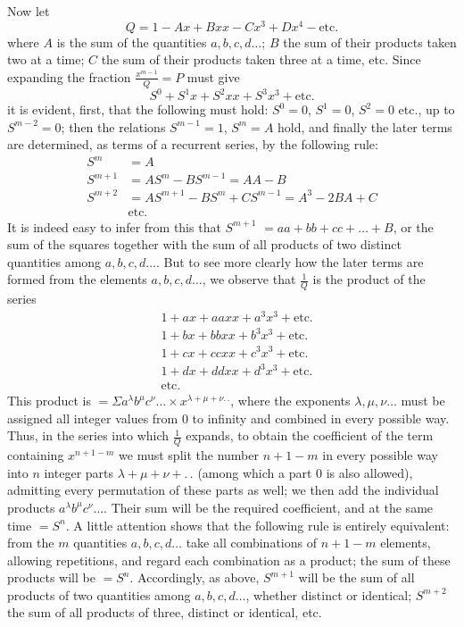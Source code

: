 Now let
\[
Q=1-Ax+Bxx-Cx^3+Dx^4-\text{etc.}
\]
where $A$ is the sum of the quantities $a,b,c,d\ldots$; $B$ the sum of their products taken two at a time; $C$ the sum of their products taken three at a time, etc. Since expanding the fraction $\frac{x^{m-1}}Q=P$ must give
\[
S^0+S^1x+S^2xx+S^3x^3+\text{etc.}
\]
it is evident, first, that the following must hold: $S^0=0$, $S^1=0$, $S^2=0$ etc., up to $S^{m-2}=0$; then
the relations $S^{m-1}=1$, $S^m=A$ hold, and finally the later terms are determined, as terms of a recurrent series, by the following rule:
\[
\begin{aligned}
S^m&=A\\
S^{m+1}&=AS^m-BS^{m-1}=AA-B\\
S^{m+2}&=AS^{m+1}-BS^m+CS^{m-1}=A^3-2BA+C\\
&\text{etc.}
\end{aligned}
\]
It is indeed easy to infer from this that $S^{m+1}$ $=aa+bb+cc+\ldots+B$, or the sum of the squares together with the sum of all products of two distinct quantities among $a,b,c,d\ldots$. But to see more clearly how the later terms are formed from the elements $a,b,c,d\ldots$, we observe that $\frac1Q$ is the product of the series
\[
\begin{aligned}
&1+ax+aaxx+a^3x^3+\text{etc.}\\
&1+bx+bbxx+b^3x^3+\text{etc.}\\
&1+cx+ccxx+c^3x^3+\text{etc.}\\
&1+dx+ddxx+d^3x^3+\text{etc.}\\
&\text{etc.}
\end{aligned}
\]
This product is $=\Sigma a^\lambda b^\mu c^\nu\ldots\times x^{\lambda+\mu+\nu.\,.}$, where the exponents $\lambda,\mu,\nu\ldots$ must be assigned all integer values from 0 to infinity and combined in every possible way. Thus, in the series into which $\frac1Q$ expands, to obtain the coefficient of the term containing $x^{n+1-m}$ we must split the number $n+1-m$ in every possible way into $n$ integer parts $\lambda+\mu+\nu+.\,.$ (among which a part 0 is also allowed), admitting every permutation of these parts as well; we then add the individual products $a^\lambda b^\mu c^\nu\ldots$. Their sum will be the required coefficient, and at the same time $=S^n$. A little attention shows that the following rule is entirely equivalent: from the $m$ quantities $a,b,c,d\ldots$ take all combinations of $n+1-m$ elements, allowing repetitions, and regard each combination as a product; the sum of these products will be $=S^n$. Accordingly, as above, $S^{m+1}$ will be the sum of all products of two quantities among $a,b,c,d\ldots$, whether distinct or identical; $S^{m+2}$ the sum of all products of three, distinct or identical, etc.


